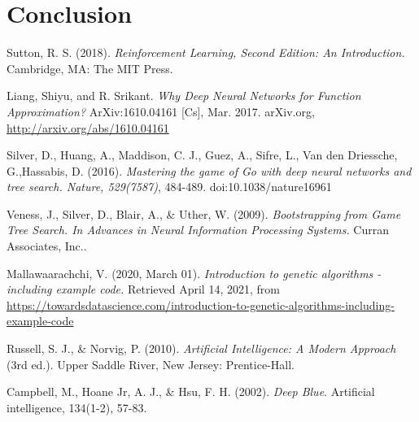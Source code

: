 \documentclass[a4paper,12pt,table]{article}
\begin{document}
    

\section{Conclusion}

\newpage
\begin{thebibliography}{9}
    Sutton, R. S. (2018). \textit{Reinforcement Learning, Second Edition: An Introduction.} Cambridge, MA: The MIT Press.

    Liang, Shiyu, and R. Srikant. \textit{Why Deep Neural Networks for Function Approximation?} ArXiv:1610.04161 [Cs], Mar. 2017. arXiv.org, \href{http://arxiv.org/abs/1610.04161}{http://arxiv.org/abs/1610.04161}

    Silver, D., Huang, A., Maddison, C. J., Guez, A., Sifre, L., Van den Driessche, G.,Hassabis, D. (2016). \textit{Mastering the game of Go with deep neural networks and tree search. Nature, 529(7587)}, 484-489. doi:10.1038/nature16961

    Veness, J., Silver, D., Blair, A., \& Uther, W. (2009). \textit{Bootstrapping from Game Tree Search. In Advances in Neural Information Processing Systems.} Curran Associates, Inc..

    Mallawaarachchi, V. (2020, March 01). \textit{Introduction to genetic algorithms - including example code.} Retrieved April 14, 2021, from 
    \href{https://towardsdatascience.com/introduction-to-genetic-algorithms-including-example-code-e396e98d8bf3#:~:text=A%20genetic%20algorithm%20is%20a,offspring%20of%20the%20next%20generation.}{https://towardsdatascience.com/introduction-to-genetic-algorithms-including-example-code}
    
    Russell, S. J., \& Norvig, P. (2010). \textit{Artificial Intelligence: A Modern Approach} (3rd ed.). Upper Saddle River, New Jersey: Prentice-Hall.
    
    Campbell, M., Hoane Jr, A. J., \& Hsu, F. H. (2002). \textit{Deep Blue}. Artificial intelligence, 134(1-2), 57-83.

\end{thebibliography}
\end{document}
